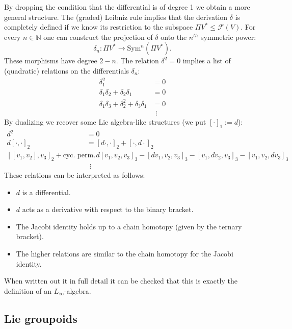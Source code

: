     By dropping the condition that the differential is of degree 1 we obtain a more general structure. The (graded) Leibniz rule implies that the derivation $\delta$ is completely defined if we know its restriction to the subspace $\Pi V^*\leq\mathcal{F}(V)$. For every $n\in\mathbb{N}$ one can construct the projection of $\delta$ onto the $n^{th}$ symmetric power: \[\delta_n:\Pi V^*\rightarrow\text{Sym}^n(\Pi V^*).\] These morphisms have degree $2-n$. The relation $\delta^2=0$ implies a list of (quadratic) relations on the differentials $\delta_n$:
    \begin{align*}
        \delta_1^2 &= 0\\
        \delta_1\delta_2+\delta_2\delta_1 &= 0\\
        \delta_1\delta_3+\delta_2^2+\delta_3\delta_1 &= 0\\
        &\ \ \vdots
    \end{align*}
    By dualizing we recover some Lie algebra-like structures (we put $[\cdot]_1:=d$):
    \begin{align*}
        d^2&=0\\
        d[\cdot,\cdot]_2 &= [d\cdot,\cdot]_2+[\cdot,d\cdot]_2\\
        [[v_1,v_2],v_3]_2+\text{cyc. perm.} &= d[v_1,v_2,v_3]_3-[dv_1,v_2,v_3]_3-[v_1,dv_2,v_3]_3-[v_1,v_2,dv_3]_3\\
        &\ \ \vdots
    \end{align*}
    These relations can be interpreted as follows:
    \begin{itemize}
        \item $d$ is a differential.
        \item $d$ acts as a derivative with respect to the binary bracket.
        \item The Jacobi identity holds up to a chain homotopy (given by the ternary bracket).
        \item The higher relations are similar to the chain homotopy for the Jacobi identity.
    \end{itemize}
    When written out it in full detail it can be checked that this is exactly the definition of an $L_\infty$-algebra.

\subsection{Lie groupoids}


